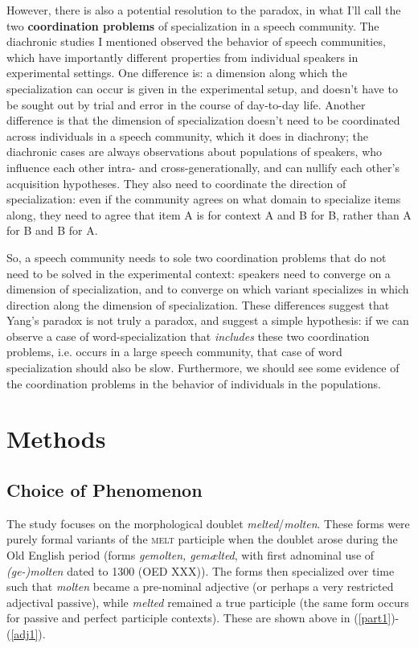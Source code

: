 \documentclass{artikel3}
\begin{document}
However, there is also a potential resolution to the paradox, in what I'll call the two \textbf{coordination problems} of specialization in a speech community. The diachronic studies I mentioned observed the behavior of speech communities, which have importantly different properties from individual speakers in experimental settings.  One difference is: a dimension along which the specialization can occur is given in the experimental setup, and doesn't have to be sought out by trial and error in the course of day-to-day life. Another difference is that the dimension of specialization doesn't need to be coordinated across individuals in a speech community, which it does in diachrony; the diachronic cases are always observations about populations of speakers, who influence each other intra- and cross-generationally, and can nullify each other's acquisition hypotheses. They also need to coordinate the direction of specialization: even if the community agrees on what domain to specialize items along, they need to agree that item A is for context A and B for B, rather than A for B and B for A. 

So, a speech community needs to sole two coordination problems that do not need to be solved in the experimental context: speakers need to converge on a dimension of specialization, and to converge on which variant specializes in which direction along the dimension of specialization. These differences suggest that Yang's paradox is not truly a paradox, and suggest a simple hypothesis: if we can observe a case of word-specialization that \textsl{includes} these two coordination problems, i.e. occurs in a large speech community, that case of word specialization should also be slow. Furthermore, we should see some evidence of the coordination problems in the behavior of individuals in the populations. 



\section{Methods}
\label{methods}

\subsection{Choice of Phenomenon}

The study focuses on the morphological doublet \textsl{melted}/\textsl{molten}. These forms were purely formal variants of the \textsc{melt} participle when the doublet arose during the Old English period (forms \textsl{gemolten, gemælted}, with first adnominal use of \textsl{(ge-)molten} dated to 1300 (OED XXX)). The forms then specialized over time such that \textsl{molten} became a pre-nominal adjective (or perhaps a very restricted adjectival passive), while \textsl{melted} remained a true participle (the same form occurs for passive and perfect participle contexts). These are shown above in (\ref{part1})-(\ref{adj1}). 
\end{document}
